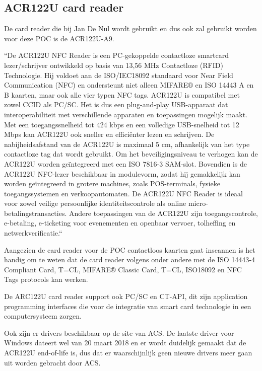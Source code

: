 \subsection{ACR122U card reader}
De card reader die bij Jan De Nul wordt gebruikt en dus ook zal gebruikt worden voor deze POC is de ACR122U-A9.

``De ACR122U NFC Reader is een PC-gekoppelde contactloze smartcard lezer/schrijver ontwikkeld op basis van 13,56 MHz Contactloze (RFID) Technologie. Hij voldoet aan de ISO/IEC18092 standaard voor Near Field Communication (NFC) en ondersteunt niet alleen MIFARE® en ISO 14443 A en B kaarten, maar ook alle vier typen NFC tags.
ACR122U is compatibel met zowel CCID als PC/SC. Het is dus een plug-and-play USB-apparaat dat interoperabiliteit met verschillende apparaten en toepassingen mogelijk maakt. Met een toegangssnelheid tot 424 kbps en een volledige USB-snelheid tot 12 Mbps kan ACR122U ook sneller en efficiënter lezen en schrijven. De nabijheidsafstand van de ACR122U is maximaal 5 cm, afhankelijk van het type contactloze tag dat wordt gebruikt.
Om het beveiligingsniveau te verhogen kan de ACR122U worden geïntegreerd met een ISO 7816-3 SAM-slot. Bovendien is de ACR122U NFC-lezer beschikbaar in modulevorm, zodat hij gemakkelijk kan worden geïntegreerd in grotere machines, zoals POS-terminals, fysieke toegangssystemen en verkoopautomaten.
De ACR122U NFC Reader is ideaal voor zowel veilige persoonlijke identiteitscontrole als online micro-betalingstransacties. Andere toepassingen van de ACR122U zijn toegangscontrole, e-betaling, e-ticketing voor evenementen en openbaar vervoer, tolheffing en netwerkverificatie.``\autocite{ACSACR122U}

Aangezien de card reader voor de POC contactloos kaarten gaat inscannen is het handig om te weten dat de card reader volgens \textcite{ACSACR122U} onder andere met de ISO 14443-4 Compliant Card, T=CL, MIFARE® Classic Card, T=CL, ISO18092 en NFC Tags protocols kan werken.

De ARC122U card reader support ook PC/SC en CT-API, dit zijn application programming interfaces die voor de integratie van smart card technologie in een computersysteem zorgen.

Ook zijn er drivers beschikbaar op de site van ACS. De laatste driver voor Windows dateert wel van 20 maart 2018 en er wordt duidelijk gemaakt dat de ACR122U end-of-life is, dus dat er waarschijnlijk geen nieuwe drivers meer gaan uit worden gebracht door ACS.




